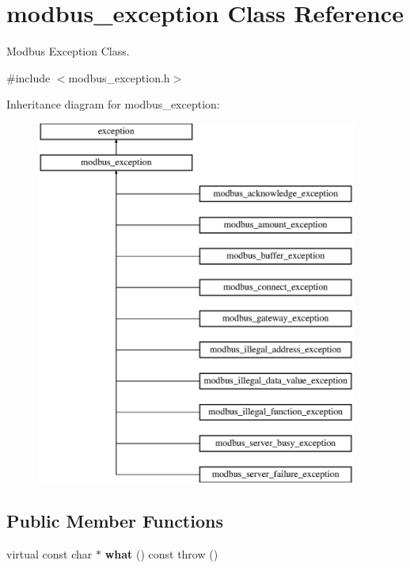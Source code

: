 \hypertarget{classmodbus__exception}{}\section{modbus\+\_\+exception Class Reference}
\label{classmodbus__exception}


Modbus Exception Class.  




{\ttfamily \#include $<$modbus\+\_\+exception.\+h$>$}

Inheritance diagram for modbus\+\_\+exception\+:\begin{figure}[H]
\begin{center}
\leavevmode
\includegraphics[height=12.000000cm]{classmodbus__exception}
\end{center}
\end{figure}
\subsection*{Public Member Functions}
\begin{DoxyCompactItemize}
\item 
\mbox{\label{classmodbus__exception_a88e2babcdc6ee2b05b31523a17b649df}} 
virtual const char $\ast$ {\bfseries what} () const  throw ()
\end{DoxyCompactItemize}
